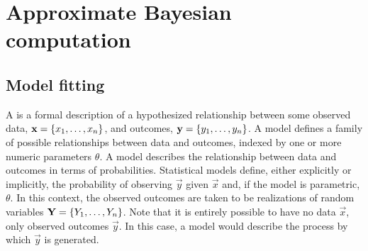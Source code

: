 %



\section{Approximate Bayesian computation}
\label{sec:abc}

\subsection{Model fitting}
\label{subsec:mfit}

A  is a formal description of a hypothesized
relationship between some observed data, $\mathbf{x} = \left\lbrace x_1, \ldots, x_n\right\rbrace$,
and outcomes, $\mathbf{y} = \left\lbrace y_1, \ldots, y_n\right\rbrace$. A  model
defines a family of possible relationships between data and outcomes, indexed
by one or more numeric parameters $\theta$. A  model
describes the relationship between data and outcomes in terms of probabilities.
Statistical models define, either explicitly or implicitly, the probability of
observing $\vec{y}$ given $\vec{x}$ and, if the model is parametric, $\theta$.
In this context, the observed outcomes are taken to be realizations of random
variables $\mathbf{Y} = \left\lbrace Y_1, \ldots, Y_n\right\rbrace$. Note that it is entirely possible
to have no data $\vec{x}$, only observed outcomes $\vec{y}$. In this case, a
model would describe the process by which $\vec{y}$ is generated.


